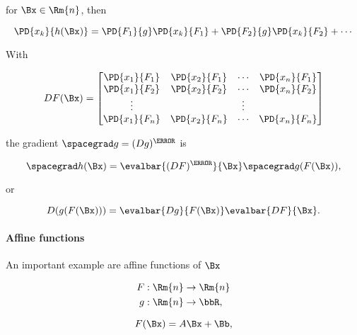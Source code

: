 for \( \Bx \in \Rm{n} \), then

\begin{dmath}\label{eqn:convex-optimizationLecture2:624}
\PD{x_k}{h(\Bx)}
=
\PD{F_1}{g}
\PD{x_k}{F_1}
+
\PD{F_2}{g}
\PD{x_k}{F_2}
+
\cdots
\end{dmath}

With

\begin{dmath}\label{eqn:convex-optimizationLecture2:644}
D F(\Bx)
=
\begin{bmatrix}
\PD{x_1}{F_1} & \PD{x_2}{F_1} & \cdots & \PD{x_n}{F_1} \\
\PD{x_1}{F_2} & \PD{x_2}{F_2} & \cdots & \PD{x_n}{F_2} \\
\vdots & & \vdots & \\
\PD{x_1}{F_n} & \PD{x_2}{F_n} & \cdots & \PD{x_n}{F_n} \\
\end{bmatrix}
\end{dmath}

the gradient \( \spacegrad g = (D g)^\T \) is

\begin{dmath}\label{eqn:convex-optimizationLecture2:664}
\spacegrad h(\Bx)
=
\evalbar{ (D F)^\T }{\Bx}
\spacegrad g(F(\Bx)),
\end{dmath}

or

\begin{dmath}\label{eqn:convex-optimizationLecture2:665}
D (g(F(\Bx)))
=
\evalbar{D g}{F(\Bx)}
\evalbar{D F}{\Bx}.
\end{dmath}

\paragraph{Affine functions}

An important example are affine functions of \( \Bx \)

\begin{dmath}\label{eqn:convex-optimizationLecture2:744}
\begin{aligned}
F &: \Rm{n} \rightarrow \Rm{n} \\
g &: \Rm{n} \rightarrow \bbR,
\end{aligned}
\end{dmath}

\begin{dmath}\label{eqn:convex-optimizationLecture2:764}
F(\Bx) = A \Bx + \Bb,
\end{dmath}

